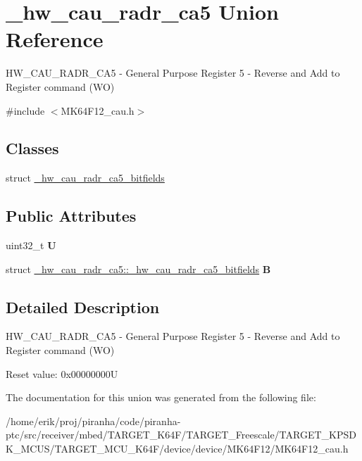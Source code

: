 \hypertarget{union__hw__cau__radr__ca5}{}\section{\+\_\+hw\+\_\+cau\+\_\+radr\+\_\+ca5 Union Reference}
\label{union__hw__cau__radr__ca5}


H\+W\+\_\+\+C\+A\+U\+\_\+\+R\+A\+D\+R\+\_\+\+C\+A5 -\/ General Purpose Register 5 -\/ Reverse and Add to Register command (WO)  




{\ttfamily \#include $<$M\+K64\+F12\+\_\+cau.\+h$>$}

\subsection*{Classes}
\begin{DoxyCompactItemize}
\item 
struct \hyperlink{struct__hw__cau__radr__ca5_1_1__hw__cau__radr__ca5__bitfields}{\+\_\+hw\+\_\+cau\+\_\+radr\+\_\+ca5\+\_\+bitfields}
\end{DoxyCompactItemize}
\subsection*{Public Attributes}
\begin{DoxyCompactItemize}
\item 
uint32\+\_\+t {\bfseries U}\hypertarget{union__hw__cau__radr__ca5_aabf6870318879ffe50f0b6a2d8171d58}{}\label{union__hw__cau__radr__ca5_aabf6870318879ffe50f0b6a2d8171d58}

\item 
struct \hyperlink{struct__hw__cau__radr__ca5_1_1__hw__cau__radr__ca5__bitfields}{\+\_\+hw\+\_\+cau\+\_\+radr\+\_\+ca5\+::\+\_\+hw\+\_\+cau\+\_\+radr\+\_\+ca5\+\_\+bitfields} {\bfseries B}\hypertarget{union__hw__cau__radr__ca5_af8688e61e6b227f79a32183b869126e2}{}\label{union__hw__cau__radr__ca5_af8688e61e6b227f79a32183b869126e2}

\end{DoxyCompactItemize}


\subsection{Detailed Description}
H\+W\+\_\+\+C\+A\+U\+\_\+\+R\+A\+D\+R\+\_\+\+C\+A5 -\/ General Purpose Register 5 -\/ Reverse and Add to Register command (WO) 

Reset value\+: 0x00000000U 

The documentation for this union was generated from the following file\+:\begin{DoxyCompactItemize}
\item 
/home/erik/proj/piranha/code/piranha-\/ptc/src/receiver/mbed/\+T\+A\+R\+G\+E\+T\+\_\+\+K64\+F/\+T\+A\+R\+G\+E\+T\+\_\+\+Freescale/\+T\+A\+R\+G\+E\+T\+\_\+\+K\+P\+S\+D\+K\+\_\+\+M\+C\+U\+S/\+T\+A\+R\+G\+E\+T\+\_\+\+M\+C\+U\+\_\+\+K64\+F/device/device/\+M\+K64\+F12/M\+K64\+F12\+\_\+cau.\+h\end{DoxyCompactItemize}
